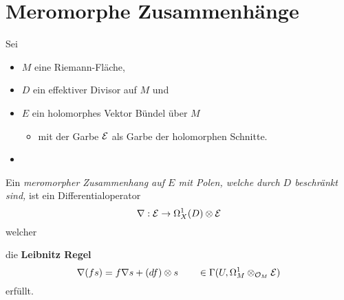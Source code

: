 \section{Meromorphe Zusammenhänge} %
Sei
\begin{itemize}
  \item $M$ eine Riemann-Fläche\marginnote{$\C$},
  \item $D$ ein effektiver Divisor auf $M$ und
  \item $E$ ein holomorphes Vektor Bündel über $M$
    \begin{itemize}
      \item mit der Garbe $\mathcal{E}$ als Garbe der holomorphen Schnitte.
    \end{itemize}
  \item {}
\end{itemize}
\begin{defn}
  Ein \emph{meromorpher Zusammenhang auf $E$ mit Polen, welche durch $D$
  beschränkt sind,} ist ein Differentialoperator
  \[
    \nabla:\mathcal{E}\to\Omega_X^1(D)\otimes\mathcal{E}
  \]
  welcher
  \begin{comment}
    \begin{itemize}
      \item für
        \begin{itemize}
          \item alle offenen Mengen $U\subset M$,
          \item alle Schnitte $s\in\Gamma(U,\cE)$ und
          \item alle holomorphen Funktionen $f\in\cO(U)$
        \end{itemize}
    \end{itemize}
  \end{comment}
  die \textbf{Leibnitz Regel}
  \[
    \nabla(fs)=f\nabla s+(df)\otimes s
    \qquad
    \in\Gamma(U,\Omega_M^1\otimes_{\mathcal{O}_M}\mathcal{E})
  \]
  erfüllt.
  \begin{comment}
    \begin{defn}
      Ein Zusammenhang heiß \emph{flach} oder \emph{integrabel} falls
      \begin{itemize}
        \item seine Krümmung $R_\nabla\equiv0$
          wobei
          \begin{itemize}
            \item $R_\nabla
              :=\nabla\circ\nabla:\cE\to\Omega_M^2\otimes_{\cO_M}\cE$
          \end{itemize}
      \end{itemize}
      \begin{rem}[ \cite{sabbah2007isomonodromic} Rem 0.12.5]
        Falls $\dim(M)=1$ ist jeder Zusammenhang flach.
      \end{rem}
    \end{defn}
  \end{comment}
\end{defn}
